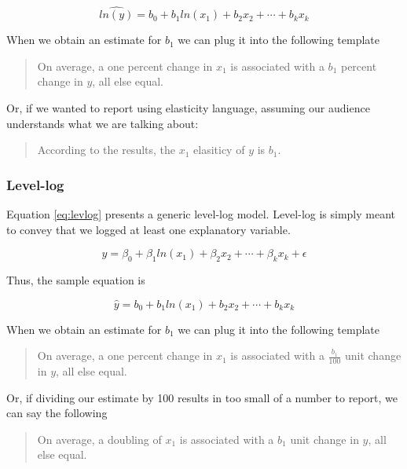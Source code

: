 \documentclass[
]{book}
\begin{document}
\begin{equation}
\hat{ln(y)}=b_0 + b_1ln(x_1) + b_2x_2 + \cdots + b_kx_k
\label{eq:loglogsamp}
\end{equation}

When we obtain an estimate for \(b_1\) we can plug it into the following template

\begin{quote}
On average, a one percent change in \(x_1\) is associated with a \(b_1\) percent change in \(y\), all else equal.
\end{quote}

Or, if we wanted to report using elasticity language, assuming our audience understands what we are talking about:

\begin{quote}
According to the results, the \(x_1\) elasiticy of \(y\) is \(b_1\).
\end{quote}

\hypertarget{level-log}{%
\subsubsection*{Level-log}\label{level-log}}

Equation \eqref{eq:levlog} presents a generic level-log model. Level-log is simply meant to convey that we logged at least one explanatory variable.

\begin{equation}
y=\beta_0 + \beta_1ln(x_1) + \beta_2x_2 + \cdots + \beta_kx_k + \epsilon
\label{eq:levlog}
\end{equation}

Thus, the sample equation is

\begin{equation}
\hat{y}=b_0 + b_1ln(x_1) + b_2x_2 + \cdots + b_kx_k
\label{eq:levlogsamp}
\end{equation}

When we obtain an estimate for \(b_1\) we can plug it into the following template

\begin{quote}
On average, a one percent change in \(x_1\) is associated with a \(\frac{b_1}{100}\) unit change in \(y\), all else equal.
\end{quote}

Or, if dividing our estimate by 100 results in too small of a number to report, we can say the following

\begin{quote}
On average, a doubling of \(x_1\) is associated with a \(b_1\) unit change in \(y\), all else equal.
\end{quote}
\end{document}
